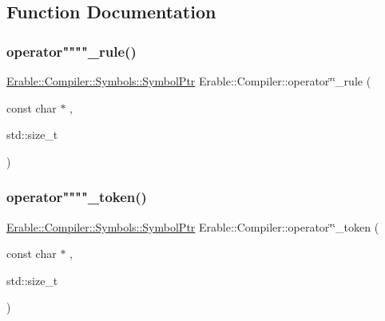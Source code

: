 \subsection{Function Documentation}
\mbox{\label{namespace_erable_1_1_compiler_a52f9bdafa61786211189defd613c141f}} 
\subsubsection{\texorpdfstring{operator""""\_rule()}{operator""\_rule()}}
{\footnotesize\ttfamily \mbox{\hyperlink{namespace_erable_1_1_compiler_1_1_symbols_a8f0bc762f448ea4d84e8713ab3e140b9}{Erable\+::\+Compiler\+::\+Symbols\+::\+Symbol\+Ptr}} Erable\+::\+Compiler\+::operator\char`\"{}\char`\"{}\+\_\+rule (\begin{DoxyParamCaption}\item[{const char $\ast$}]{,  }\item[{std\+::size\+\_\+t}]{ }\end{DoxyParamCaption})}

\mbox{\label{namespace_erable_1_1_compiler_a12e383814331039594edb91cc0b9ecd0}} 
\subsubsection{\texorpdfstring{operator""""\_token()}{operator""\_token()}}
{\footnotesize\ttfamily \mbox{\hyperlink{namespace_erable_1_1_compiler_1_1_symbols_a8f0bc762f448ea4d84e8713ab3e140b9}{Erable\+::\+Compiler\+::\+Symbols\+::\+Symbol\+Ptr}} Erable\+::\+Compiler\+::operator\char`\"{}\char`\"{}\+\_\+token (\begin{DoxyParamCaption}\item[{const char $\ast$}]{,  }\item[{std\+::size\+\_\+t}]{ }\end{DoxyParamCaption})}

\mbox{\label{namespace_erable_1_1_compiler_ae3989a29a829966e863310ccf942e128}} 
